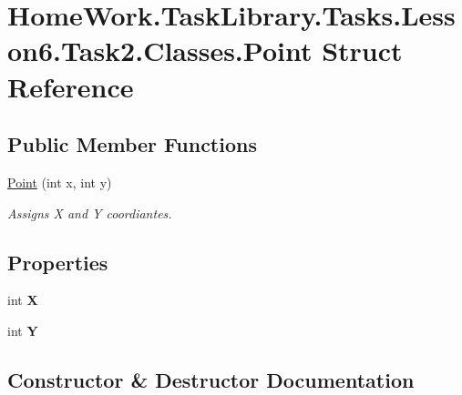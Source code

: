 \hypertarget{struct_home_work_1_1_task_library_1_1_tasks_1_1_lesson6_1_1_task2_1_1_classes_1_1_point}{}\section{Home\+Work.\+Task\+Library.\+Tasks.\+Lesson6.\+Task2.\+Classes.\+Point Struct Reference}
\label{struct_home_work_1_1_task_library_1_1_tasks_1_1_lesson6_1_1_task2_1_1_classes_1_1_point}
\subsection*{Public Member Functions}
\begin{DoxyCompactItemize}
\item 
\mbox{\hyperlink{struct_home_work_1_1_task_library_1_1_tasks_1_1_lesson6_1_1_task2_1_1_classes_1_1_point_a471e78b9ad7b37e80f168f81b38846a2}{Point}} (int x, int y)
\begin{DoxyCompactList}\small\item\em Assigns X and Y coordiantes. \end{DoxyCompactList}\end{DoxyCompactItemize}
\subsection*{Properties}
\begin{DoxyCompactItemize}
\item 
\mbox{\label{struct_home_work_1_1_task_library_1_1_tasks_1_1_lesson6_1_1_task2_1_1_classes_1_1_point_ab65f4d2cafbd1e2aa0fb9122566a6229}} 
int {\bfseries X}
\item 
\mbox{\label{struct_home_work_1_1_task_library_1_1_tasks_1_1_lesson6_1_1_task2_1_1_classes_1_1_point_aa0bc5ad8f5564ccb2d9636839de32643}} 
int {\bfseries Y}
\end{DoxyCompactItemize}


\subsection{Constructor \& Destructor Documentation}
\mbox{\label{struct_home_work_1_1_task_library_1_1_tasks_1_1_lesson6_1_1_task2_1_1_classes_1_1_point_a471e78b9ad7b37e80f168f81b38846a2}} 
